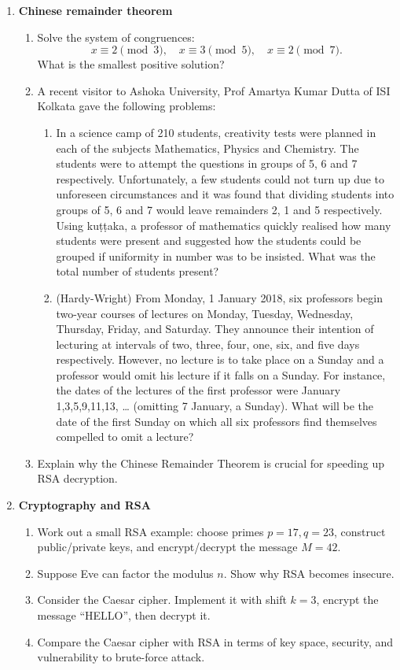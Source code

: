 \begin{enumerate}
\item \textbf{Chinese remainder theorem}
  \begin{enumerate}
    \item Solve the system of congruences:
      \[
        x \equiv 2 \pmod{3}, \quad 
        x \equiv 3 \pmod{5}, \quad 
        x \equiv 2 \pmod{7}.
      \]
      What is the smallest positive solution?
    \item A recent visitor to Ashoka University, Prof Amartya Kumar Dutta of ISI Kolkata gave the following problems:  
    \begin{enumerate}
    \item In a science camp of 210 students, creativity tests were planned in each of the subjects Mathematics, Physics and Chemistry. The students were to attempt the questions in groups of 5, 6 and 7 respectively. Unfortunately, a few students could not turn up due to unforeseen circumstances and it was found that dividing students into groups of 5, 6 and 7 would leave remainders 2, 1 and 5 respectively. Using ku\d{t}\d{t}aka, a professor of mathematics quickly realised how many students were present and suggested how the students could be grouped if uniformity in number was to be insisted. What was the total number of students present?
    \item (Hardy-Wright) From Monday, 1 January 2018, six professors begin two-year courses of lectures on Monday, Tuesday, Wednesday, Thursday, Friday, and Saturday. They announce their intention of lecturing at intervals of two, three, four, one, six, and five days respectively. However, no lecture is to take place on a Sunday and a professor would omit his lecture if it falls on a Sunday. For instance, the dates of the lectures of the first professor were January 1,3,5,9,11,13, … (omitting 7 January, a Sunday). What will be the date of the first Sunday on which all six professors find themselves compelled to omit a lecture?
    \end{enumerate}
    \item Explain why the Chinese Remainder Theorem is crucial for speeding up RSA decryption.
  \end{enumerate}

\item \textbf{Cryptography and RSA}
  \begin{enumerate}
    \item Work out a small RSA example: choose primes $p=17, q=23$, construct public/private keys, 
          and encrypt/decrypt the message $M=42$.
    \item Suppose Eve can factor the modulus $n$. Show why RSA becomes insecure.
    \item Consider the Caesar cipher. Implement it with shift $k=3$, encrypt the message ``HELLO'', 
          then decrypt it.
    \item Compare the Caesar cipher with RSA in terms of key space, security, and vulnerability to 
          brute-force attack.
  \end{enumerate}


\end{enumerate}
